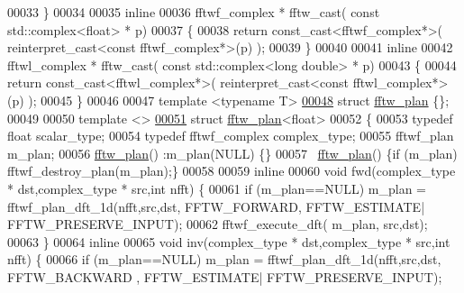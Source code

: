 \begin{DoxyCode}
00033   \}
00034 
00035   \textcolor{keyword}{inline} 
00036   fftwf\_complex * fftw\_cast( \textcolor{keyword}{const} std::complex<float> * p)
00037   \{ 
00038       \textcolor{keywordflow}{return} \textcolor{keyword}{const\_cast<}fftwf\_complex*\textcolor{keyword}{>}( \textcolor{keyword}{reinterpret\_cast<}\textcolor{keyword}{const }fftwf\_complex*\textcolor{keyword}{>}(p) ); 
00039   \}
00040 
00041   \textcolor{keyword}{inline} 
00042   fftwl\_complex * fftw\_cast( \textcolor{keyword}{const} std::complex<long double> * p)
00043   \{ 
00044       \textcolor{keywordflow}{return} \textcolor{keyword}{const\_cast<}fftwl\_complex*\textcolor{keyword}{>}( \textcolor{keyword}{reinterpret\_cast<}\textcolor{keyword}{const }fftwl\_complex*\textcolor{keyword}{>}(p) ); 
00045   \}
00046 
00047   \textcolor{keyword}{template} <\textcolor{keyword}{typename} T> 
\hyperlink{struct_eigen_1_1internal_1_1fftw__plan}{00048}   \textcolor{keyword}{struct }\hyperlink{struct_eigen_1_1internal_1_1fftw__plan}{fftw\_plan} \{\};
00049 
00050   \textcolor{keyword}{template} <> 
\hyperlink{struct_eigen_1_1internal_1_1fftw__plan_3_01float_01_4}{00051}   \textcolor{keyword}{struct }\hyperlink{struct_eigen_1_1internal_1_1fftw__plan}{fftw\_plan}<float>
00052   \{
00053       \textcolor{keyword}{typedef} \textcolor{keywordtype}{float} scalar\_type;
00054       \textcolor{keyword}{typedef} fftwf\_complex complex\_type;
00055       fftwf\_plan m\_plan;
00056       \hyperlink{struct_eigen_1_1internal_1_1fftw__plan}{fftw\_plan}() :m\_plan(NULL) \{\}
00057       ~\hyperlink{struct_eigen_1_1internal_1_1fftw__plan}{fftw\_plan}() \{\textcolor{keywordflow}{if} (m\_plan) fftwf\_destroy\_plan(m\_plan);\}
00058 
00059       \textcolor{keyword}{inline}
00060       \textcolor{keywordtype}{void} fwd(complex\_type * dst,complex\_type * src,\textcolor{keywordtype}{int} nfft) \{
00061           \textcolor{keywordflow}{if} (m\_plan==NULL) m\_plan = fftwf\_plan\_dft\_1d(nfft,src,dst, FFTW\_FORWARD, FFTW\_ESTIMATE|
      FFTW\_PRESERVE\_INPUT);
00062           fftwf\_execute\_dft( m\_plan, src,dst);
00063       \}
00064       \textcolor{keyword}{inline}
00065       \textcolor{keywordtype}{void} inv(complex\_type * dst,complex\_type * src,\textcolor{keywordtype}{int} nfft) \{
00066           \textcolor{keywordflow}{if} (m\_plan==NULL) m\_plan = fftwf\_plan\_dft\_1d(nfft,src,dst, FFTW\_BACKWARD , FFTW\_ESTIMATE|
      FFTW\_PRESERVE\_INPUT);

\end{DoxyCode}
